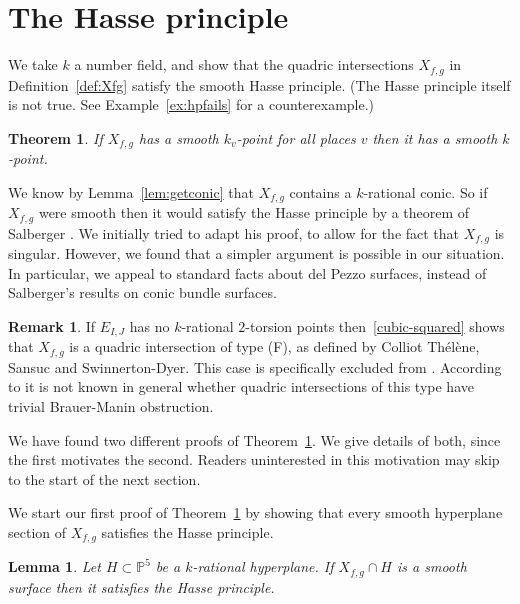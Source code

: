 \documentclass[12pt]{amsart}
\newcommand{\PP}{{\mathbb P}}
\newtheorem{Theorem}[Proposition]{Theorem}
\newtheorem{Lemma}[Proposition]{Lemma}
\theoremstyle{definition}
\newtheorem{Remark}[Proposition]{Remark}
\begin{document}
\section{The Hasse principle}
\label{sec:hp}

We take $k$ a number field, and show that the quadric
intersections $X_{f,g}$ in Definition~\ref{def:Xfg} satisfy the smooth
Hasse principle. (The Hasse principle itself is not true.
See Example~\ref{ex:hpfails} for a counterexample.)

\begin{Theorem}
  \label{thm:hp}
  If $X_{f,g}$ has a smooth $k_v$-point for all places $v$ then it has
  a smooth $k$-point.
\end{Theorem}

We know by Lemma~\ref{lem:getconic} that $X_{f,g}$ contains a
$k$-rational conic.  So if $X_{f,g}$ were smooth then it would satisfy
the Hasse principle by a theorem of Salberger \cite{Sal}. We initially
tried to adapt his proof, to allow for the fact that $X_{f,g}$ is
singular. However, we found that a simpler argument is possible in our
situation.
In particular, we appeal to standard facts about del Pezzo surfaces,
instead of Salberger's results on conic bundle surfaces.

\begin{Remark}
  If $E_{I,J}$ has no $k$-rational $2$-torsion points
  then~\eqref{cubic-squared} shows that $X_{f,g}$ is a quadric
  intersection of type (F), as defined by Colliot Th\'el\`ene, Sansuc
  and Swinnerton-Dyer.  This case is specifically excluded from
  \cite[Theorem 3.20]{CSS}.  According to \cite[Remark 3.20.1]{CSS} it
  is not known in general whether quadric intersections of this type
  have trivial Brauer-Manin obstruction.
\end{Remark}

We have found two different proofs of Theorem~\ref{thm:hp}.  We give
details of both, since the first motivates the second.  Readers
uninterested in this motivation may %
skip to the start of the next section.

We start our first proof of Theorem~\ref{thm:hp} by showing that every
smooth hyperplane section of $X_{f,g}$ satisfies the Hasse principle.

\begin{Lemma}
  \label{lem:slice}
  Let $H \subset \PP^5$ be a $k$-rational hyperplane. If
  $X_{f,g} \cap H$ is a smooth surface then it satisfies the Hasse
  principle.
\end{Lemma}
\end{document}
